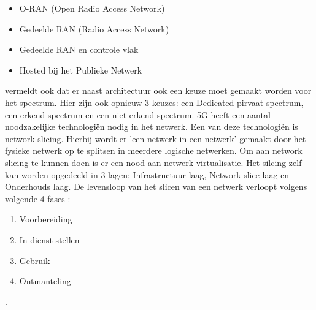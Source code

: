 \begin{itemize}
  \item O-RAN (Open Radio Access Network)
  \item Gedeelde RAN (Radio Access Network)
  \item Gedeelde RAN en controle vlak
  \item Hosted bij het Publieke Netwerk
\end{itemize}

\textcite{wen2021private} vermeldt ook dat er naast architectuur ook een keuze moet gemaakt worden voor het spectrum. Hier zijn ook opnieuw 3 keuzes: een Dedicated pirvaat spectrum, een erkend spectrum en een niet-erkend spectrum. 
5G heeft een aantal noodzakelijke technologiën nodig in het netwerk. Een van deze technologiën is network slicing. Hierbij wordt er 'een netwerk in een netwerk' gemaakt door het fysieke netwerk op te splitsen in meerdere logische netwerken. Om aan network slicing te kunnen doen is er een nood aan netwerk virtualisatie. Het silcing zelf kan worden opgedeeld in 3 lagen: Infrastructuur laag, Network slice laag en Onderhouds laag. De levensloop van het slicen van een netwerk verloopt volgens volgende 4 fases \autocite{wen2021private}:

\begin{enumerate}
  \item Voorbereiding
  \item In dienst stellen
  \item Gebruik
  \item Ontmanteling
\end{enumerate}.

